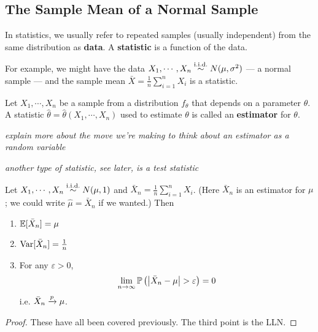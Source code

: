 \documentclass[../../../main.tex]{subfiles}
\begin{document}
\subsection{The Sample Mean of a Normal Sample}

\begin{definition}
    In statistics, we usually refer to repeated samples (usually independent) from the same distribution as \textbf{data}.
    A \textbf{statistic} is a function of the data.

    For example, we might have the data $X_1,\cdots,X_n\overset{\mathrm{i.i.d.}}{\sim} N(\mu,\sigma^2)$ --- a normal sample --- and the sample mean $\bar X=\frac{1}{n}\sum_{i=1}^n X_i$ is a statistic.
\end{definition}

\begin{definition}
    Let $X_1,\cdots,X_n$ be a sample from a distribution $f_\theta$ that depends on a parameter $\theta$.
    A statistic $\hat \theta=\hat \theta(X_1,\cdots,X_n)$ used to estimate $\theta$ is called an \textbf{estimator} for $\theta$.
\end{definition}

\textit{explain more about the move we're making to think about an estimator as a random variable}

\textit{another type of statistic, see later, is a test statistic}

\begin{proposition}
    Let $X_1,\cdots,X_n\overset{\mathrm{i.i.d.}}{\sim} N(\mu,1)$ and $\bar X_n=\frac{1}{n}\sum_{i=1}^n X_i$. 
    (Here $\bar X_n$ is an estimator for $\mu$; we could write $\hat \mu=\bar X_n$ if we wanted.)
    Then 
    \begin{enumerate}
        \item $\mathbb{E}[\bar X_n]=\mu$
        \item $\operatorname{Var}[\bar X_n]=\frac{1}{n}$
        \item For any $\varepsilon>0$, 
        \begin{equation*}
            \lim_{n\rightarrow \infty}\Prob\left(\left|\bar X_n - \mu\right|>\varepsilon\right)=0
        \end{equation*}
        i.e. $\bar X_n\xrightarrow{p} \mu$.
    \end{enumerate}
    \begin{proof}
        These have all been covered previously. The third point is the LLN.
    \end{proof}
\end{proposition}
\end{document}
